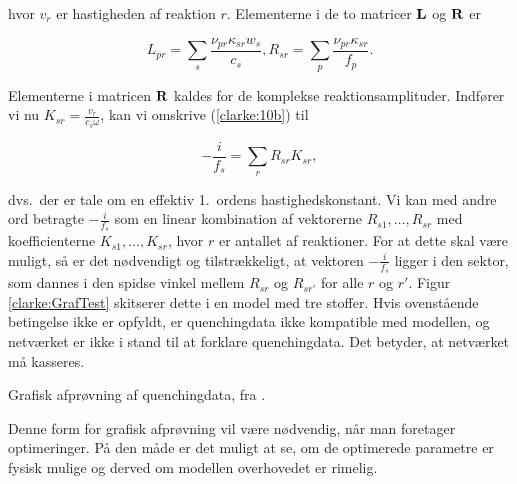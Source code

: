 hvor $v_r$ er hastigheden af reaktion $r$. Elementerne i de
to matricer $\mbox{${\bf L}$}$ og $\mbox{${\bf R}$}$ er

\begin{subequations}
  \begin{equation}
    L_{pr} = \sum_s \frac{\nu_{pr}\kappa_{sr}w_s}{c_s},
  \end{equation}

  \begin{equation}
    R_{sr} = \sum_p \frac{\nu_{pr}\kappa_{sr}}{f_p}.
  \end{equation}
\end{subequations}

Elementerne i matricen $\mbox{${\bf R}$}$ kaldes for de komplekse
reaktionsamplituder. Ind\-f{\o}rer vi nu
$K_{sr}=\frac{v_r}{c_s\omega}$, kan vi omskrive
(\ref{clarke:10b}) til

\begin{equation}
  -\frac{i}{f_s} = \sum_r R_{sr}K_{sr},
\end{equation}

dvs.\ der er tale om en effektiv 1.\ ordens
hastighedskonstant. Vi kan med andre ord betragte
$-\frac{i}{f_s}$ som en linear kombination af vektorerne
$R_{s1}, \ldots, R_{sr}$ med koefficienterne $K_{s1},
\ldots, K_{sr}$, hvor $r$ er antallet af reaktioner. For at
dette skal v{\ae}re muligt, s{\aa} er det n{\o}dvendigt og
tilstr{\ae}kkeligt, at vektoren $-\frac{i}{f_s}$ ligger i den
sektor, som dannes i den spidse vinkel mellem $R_{sr}$ og
$R_{sr\prime}$ for alle $r$ og $r\prime$. Figur
\ref{clarke:GrafTest} skitserer dette i en model med tre
stoffer. Hvis ovenst{\aa}ende betingelse ikke er opfyldt, er
quenchingdata ikke kompatible med modellen, og
netv{\ae}rket er ikke i stand til at forklare
quenchingdata. Det betyder, at netv{\ae}rket m{\aa}
kasseres.

{
\caption{\protect\capsize
Grafisk afpr{\o}vning af quenchingdata, fra
\protect\cite{tina1}.}
\label{clarke:GrafTest}
}

\vspace{4.0mm}
Denne form for grafisk afpr{\o}vning vil v{\ae}re
n{\o}dvendig, n{\aa}r man foretager optimeringer. P{\aa}
den m{\aa}de er det muligt at se, om de optimerede
parametre er fysisk mulige og derved om modellen
overhovedet er rimelig.

